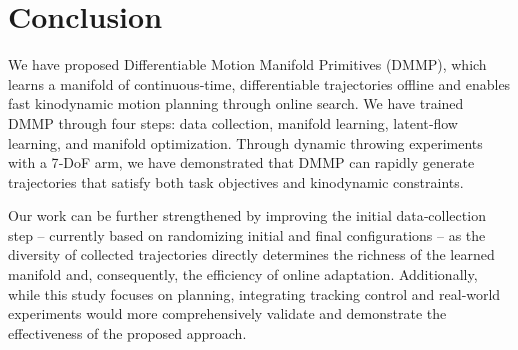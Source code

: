 \section{Conclusion}

We have proposed Differentiable Motion Manifold Primitives (DMMP), which learns a manifold of continuous‑time, differentiable trajectories offline and enables fast kinodynamic motion planning through online search.  
We have trained DMMP through four steps: data collection, manifold learning, latent‑flow learning, and manifold optimization.  
Through dynamic throwing experiments with a 7‑DoF arm, we have demonstrated that DMMP can rapidly generate trajectories that satisfy both task objectives and kinodynamic constraints.

Our work can be further strengthened by improving the initial data‑collection step -- currently based on randomizing initial and final configurations -- as the diversity of collected trajectories directly determines the richness of the learned manifold and, consequently, the efficiency of online adaptation. Additionally, while this study focuses on planning, integrating tracking control and real‑world experiments would more comprehensively validate and demonstrate the effectiveness of the proposed approach.


